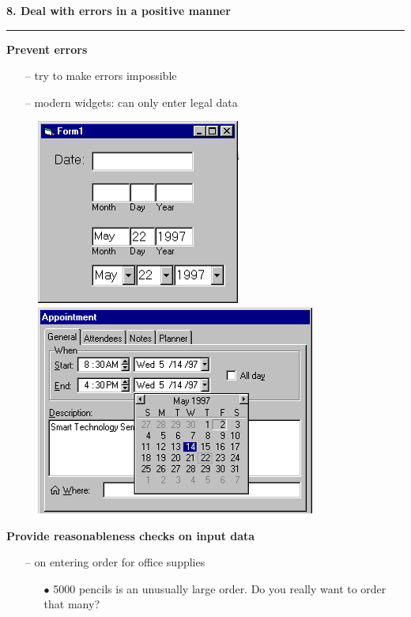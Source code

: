 \documentclass[pdf]{beamer}
\begin{document}
\begin{frame}
{\textbf{8. Deal with errors in a positive manner}}{\textcolor{red}{\rule{12cm}{1.2pt}}}

\textbf{Prevent errors}
\begin{itemize}
\item[--] try to make errors impossible
\item[--] modern widgets:  can only enter legal data
\end{itemize}
\begin{figure}[H]  
  \begin{minipage}[b]{0.4\linewidth}
    \includegraphics[width=.5\linewidth]{48_Picture8.png} 
    
  \end{minipage} 
  \begin{minipage}[b]{0.4\linewidth}
    \includegraphics[width=0.7\linewidth]{48_Picture9.png} 
   
  \end{minipage} 
  \end{figure}

\textbf{Provide reasonableness checks on input data}
\begin{itemize}
\item[--] on entering order for office supplies
	\begin{itemize}
	\item[$\bullet$] 5000 pencils is an unusually large order. Do you really want to order that many?
	\end{itemize}
\end{itemize}
\end{frame}
\end{document}
